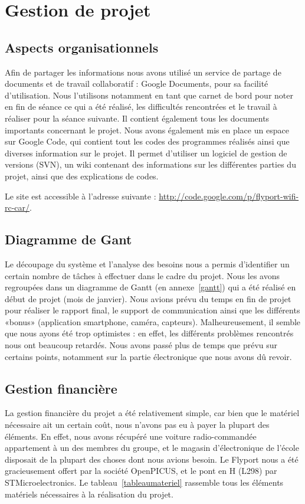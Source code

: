 \documentclass[a4paper,12pt]{report}
\begin{document}
\chapter{Gestion de projet}

	\section{Aspects organisationnels}
	Afin de partager les informations nous avons utilisé un service de partage de documents et de travail collaboratif : Google Documents, pour sa facilité d’utilisation. Nous l’utilisons notamment en tant que carnet de bord pour noter en fin de séance ce qui a été réalisé, les difficultés rencontrées et le travail à réaliser pour la séance suivante. Il contient également tous les documents importants concernant le projet.
Nous avons également mis en place un espace sur Google Code, qui contient tout les codes des programmes réalisés ainsi que diverses information sur le projet. Il permet d’utiliser un logiciel de gestion de versions (SVN), un wiki contenant des informations sur les différentes parties du projet, ainsi que des explications de codes.

Le site est accessible à l’adresse suivante : \href{http://code.google.com/p/flyport-wifi-rc-car/}{http://code.google.com/p/flyport-wifi-rc-car/}.
	
	\section{Diagramme de Gant}
	Le découpage du système et l’analyse des besoins nous a permis d’identiﬁer un certain nombre de tâches à effectuer dans le cadre du projet. Nous les avons regroupées dans un diagramme de Gantt (en annexe~\ref{gantt}) qui a été réalisé en début de projet (mois de janvier). Nous avions prévu du temps en fin de projet pour réaliser le rapport final, le support de communication ainsi que les différents «bonus» (application smartphone, caméra, capteurs).
Malheureusement, il semble que nous ayons été trop optimistes : en effet, les différents problèmes rencontrés nous ont beaucoup retardés. Nous avons passé plus de temps que prévu sur certains points, notamment sur la partie électronique que nous avons dû revoir.

	\section{Gestion financière}
	La gestion financière du projet a été relativement simple, car bien que le matériel nécessaire ait un certain coût, nous n’avons pas eu à payer la plupart des éléments. En effet, nous avons récupéré une voiture radio-commandée appartement à un des membres du groupe, et le magasin d’électronique de l’école disposait de la plupart des choses dont nous avions besoin. Le Flyport nous a été gracieusement offert par la société OpenPICUS, et le pont en H (L298) par STMicroelectronics.
	Le tableau~\ref{tableaumateriel} rassemble tous les éléments matériels nécessaires à la réalisation du projet.
	
\end{document}
